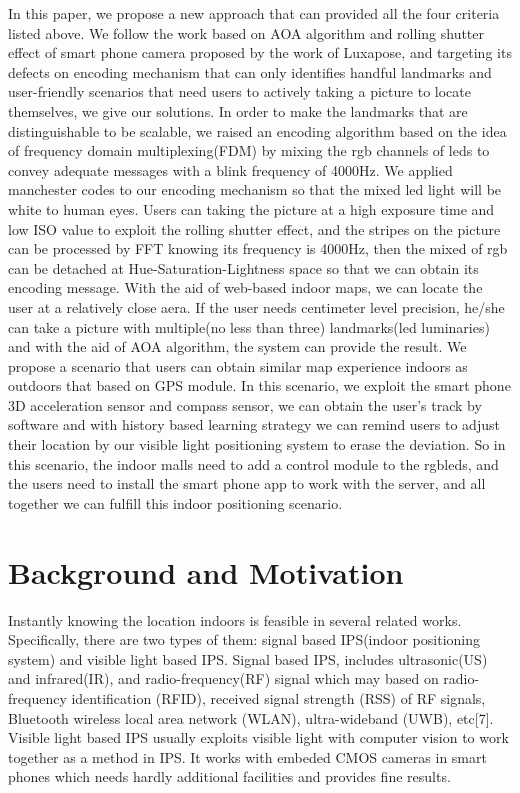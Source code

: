 \documentclass[conference]{IEEEtran}
\begin{document}
	In this paper, we propose a new approach that can provided all the four criteria listed above. We follow the work based on AOA algorithm and rolling shutter effect of smart phone camera proposed by the work of Luxapose, and targeting its defects on encoding mechanism that can only identifies handful landmarks and user-friendly scenarios that need users to actively taking a picture to locate themselves, we give our solutions. In order to make the landmarks that are distinguishable to be scalable, we raised an encoding algorithm based on the idea of frequency domain multiplexing(FDM) by mixing the rgb channels of leds to convey adequate messages with a blink frequency of 4000Hz. We applied manchester codes to our encoding mechanism so that the mixed led light will be white to human eyes. Users can taking the picture at a high exposure time and low ISO value to exploit the rolling shutter effect, and the stripes on the picture can be processed by FFT knowing its frequency is 4000Hz, then the mixed of rgb can be detached at Hue-Saturation-Lightness space so that we can obtain its encoding message. With the aid of web-based indoor maps, we can locate the user at a relatively close aera. If the user needs centimeter level precision, he/she can take a picture with multiple(no less than three) landmarks(led luminaries) and with the aid of AOA algorithm, the system can provide the result. We propose a scenario that users can obtain similar map experience indoors as outdoors that based on GPS module. In this scenario, we exploit the smart phone 3D acceleration sensor and compass sensor, we can obtain the user's track by software and with history based learning strategy we can remind users to adjust their location by our visible light positioning system to erase the deviation. So in this scenario, the indoor malls need to add a control module to the rgbleds, and the users need to install the smart phone app to work with the server, and all together we can fulfill this indoor positioning scenario.
	
\section{Background and Motivation}
	Instantly knowing the location indoors is feasible in several related works. Specifically, there are two types of them: signal based IPS(indoor positioning system) and visible light based IPS. Signal based IPS, includes ultrasonic(US) and infrared(IR), and radio-frequency(RF) signal which may based on radio-frequency identification (RFID), received signal strength (RSS) of RF signals, Bluetooth wireless local area network (WLAN), ultra-wideband (UWB), etc[7]. Visible light based IPS usually exploits visible light with computer vision to work together as a method in IPS. It works with embeded CMOS cameras in smart phones which needs hardly additional facilities and provides fine results.
	
\end{document}
